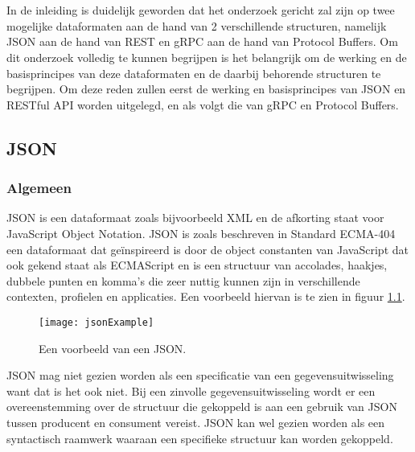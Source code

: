 \chapter{}
\label{ch:stand-van-zaken}



In de inleiding is duidelijk geworden dat het onderzoek gericht zal zijn op twee mogelijke dataformaten aan de hand van 2 verschillende structuren, namelijk JSON aan de hand van REST en gRPC aan de hand van Protocol Buffers. Om dit onderzoek volledig te kunnen begrijpen is het belangrijk om de werking en de basisprincipes van deze dataformaten en de daarbij behorende structuren te begrijpen. Om deze reden zullen eerst de werking en basisprincipes van JSON en RESTful API worden uitgelegd, en als volgt die van gRPC en Protocol Buffers.

\section{JSON}
\label{sec:JSON}

\subsection{Algemeen}
\label{subsec:Algemeen}

JSON is een dataformaat zoals bijvoorbeeld XML en de afkorting staat voor JavaScript Object Notation. JSON is zoals beschreven in Standard ECMA-404 ~\autocite{Json2017} een dataformaat dat geïnspireerd is door de object constanten van JavaScript dat ook gekend staat als ECMAScript en is een structuur van accolades, haakjes, dubbele punten en komma's die zeer nuttig kunnen zijn in verschillende contexten, profielen en applicaties. Een voorbeeld hiervan is te zien in figuur \ref{fig:jsonExample}.

\begin{figure}[H]
    \centering
    \texttt{[image: jsonExample]}
    \caption[JSON Example]{Een voorbeeld van een JSON.}
    \label{fig:jsonExample}
\end{figure}

JSON mag niet gezien worden als een specificatie van een gegevensuitwisseling want dat is het ook niet. Bij een zinvolle gegevensuitwisseling wordt er een overeenstemming over de structuur die gekoppeld is aan een gebruik van JSON tussen producent en consument vereist. JSON kan wel gezien worden als een syntactisch raamwerk waaraan een specifieke structuur kan worden gekoppeld.

